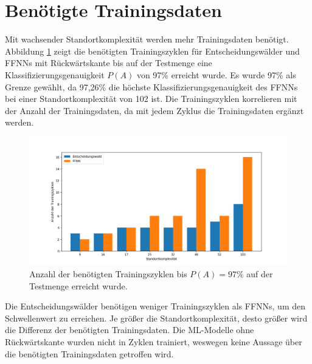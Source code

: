 \section{Benötigte Trainingsdaten}
Mit wachsender Standortkomplexität werden mehr Trainingsdaten benötigt.
Abbildung \ref{fig:required_training_data} zeigt die benötigten Trainingszyklen für Entscheidungswälder und FFNNs mit Rückwärtskante bis auf der Testmenge
eine Klassifizierungsgenauigkeit $P(A)$ von 97\% erreicht wurde.
Es wurde 97\% als Grenze gewählt, da 97,26\% die höchste Klassifizierungsgenauigkeit des FFNNs bei einer Standortkomplexität von 102 ist.
Die Trainingszyklen korrelieren mit der Anzahl der Trainingsdaten, da mit jedem Zyklus die Trainingsdaten ergänzt werden.
\begin{figure}[h!]
    \centering
    \includegraphics[width=\linewidth]{images/required_training_data.png}
    \caption{Anzahl der benötigten Trainingszyklen bis $P(A)=97\%$ auf der Testmenge erreicht wurde. }
    \label{fig:required_training_data}
\end{figure}
\newline
\newline
Die Entscheidungswälder benötigen weniger Trainingszyklen als FFNNs, um den Schwellenwert zu erreichen.
Je größer die Standortkomplexität, desto größer wird die Differenz der benötigten Trainingsdaten.
Die ML-Modelle ohne Rückwärtskante wurden nicht in Zyklen trainiert, weswegen keine Aussage über die benötigten Trainingsdaten getroffen wird.